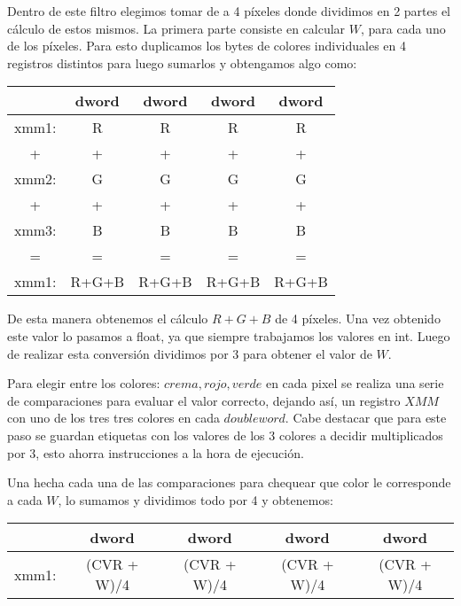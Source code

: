 Dentro de este filtro elegimos tomar de a 4 píxeles donde dividimos en 2 partes el cálculo de estos mismos. 
La primera parte consiste en calcular $W$, para cada uno de los píxeles. Para esto duplicamos los bytes de colores individuales en 4 registros distintos para luego sumarlos y obtengamos algo como:

\begin{table}[h]
\begin{center}
\begin{tabular}{|c|c|c|c|c|}
\hline
      & dword     & dword     & dword     & dword     \\ \hline
xmm1: & R     & R     & R     & R     \\ \hline
+     & +     & +     & +     & +     \\ \hline
xmm2: & G     & G     & G     & G     \\ \hline
+     & +     & +     & +     & +     \\ \hline
xmm3: & B     & B     & B     & B     \\ \hline
=     & =     & =     & =     & =     \\ \hline
xmm1: & R+G+B & R+G+B & R+G+B & R+G+B \\ \hline
\end{tabular}
\end{center}
\end{table}

De esta manera obtenemos el cálculo $R+G+B$ de 4 píxeles. Una vez obtenido este valor lo pasamos a float, ya que siempre trabajamos los valores en int. Luego de realizar esta conversión dividimos por 3 para obtener el valor de $W$.

Para elegir entre los colores: $crema, rojo, verde$ en cada pixel se realiza una serie de comparaciones para evaluar el valor correcto, dejando así, un registro $XMM$ con uno de los tres tres colores en cada $doubleword$. Cabe destacar que para este paso se guardan etiquetas con los valores de los 3 colores a decidir multiplicados por 3, esto ahorra instrucciones a la hora de ejecución.

Una hecha cada una de las comparaciones para chequear que color le corresponde a cada $W$, lo sumamos y dividimos todo por 4 y obtenemos:


\begin{table}[h]
\begin{center}
\begin{tabular}{|c|c|c|c|c|}
\hline
      & dword     & dword     & dword     & dword     \\ \hline
xmm1: & (CVR + W)/4     & (CVR + W)/4     & (CVR + W)/4     & (CVR + W)/4     \\ \hline
\end{tabular}
\end{center}
\end{table}


